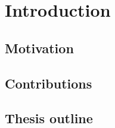 \chapter{Introduction} %
\label{cha:introduction}

\minitoc

\section{Motivation} %
\label{sec:motivation}

\lipsum



\section{Contributions} %
\label{sec:contributions}

\lipsum


\section{Thesis outline} %
\label{sec:thesis_outline}

\lipsum

